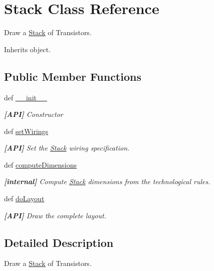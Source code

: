 \hypertarget{classpython_1_1Stack_1_1Stack}{\section{Stack Class Reference}
\label{classpython_1_1Stack_1_1Stack}
}


Draw a \hyperlink{classpython_1_1Stack_1_1Stack}{Stack} of Transistors.  




Inherits object.

\subsection*{Public Member Functions}
\begin{DoxyCompactItemize}
\item 
def \hyperlink{classpython_1_1Stack_1_1Stack_ac775ee34451fdfa742b318538164070e}{\-\_\-\-\_\-init\-\_\-\-\_\-}
\begin{DoxyCompactList}\small\item\em {\bfseries \mbox{[}A\-P\-I\mbox{]}} Constructor \end{DoxyCompactList}\item 
def \hyperlink{classpython_1_1Stack_1_1Stack_ad7f0300aaad3ad8b2de70ae6c106c102}{set\-Wirings}
\begin{DoxyCompactList}\small\item\em {\bfseries \mbox{[}A\-P\-I\mbox{]}} Set the \hyperlink{classpython_1_1Stack_1_1Stack}{Stack} wiring specification. \end{DoxyCompactList}\item 
def \hyperlink{classpython_1_1Stack_1_1Stack_a20b46b43488cc58c302b123a89299d85}{compute\-Dimensions}
\begin{DoxyCompactList}\small\item\em {\bfseries \mbox{[}internal\mbox{]}} Compute \hyperlink{classpython_1_1Stack_1_1Stack}{Stack} dimensions from the technological rules. \end{DoxyCompactList}\item 
def \hyperlink{classpython_1_1Stack_1_1Stack_affc52c42a8c72dc1125ddce55647a6f9}{do\-Layout}
\begin{DoxyCompactList}\small\item\em {\bfseries \mbox{[}A\-P\-I\mbox{]}} Draw the complete layout. \end{DoxyCompactList}\end{DoxyCompactItemize}


\subsection{Detailed Description}
Draw a \hyperlink{classpython_1_1Stack_1_1Stack}{Stack} of Transistors. 

